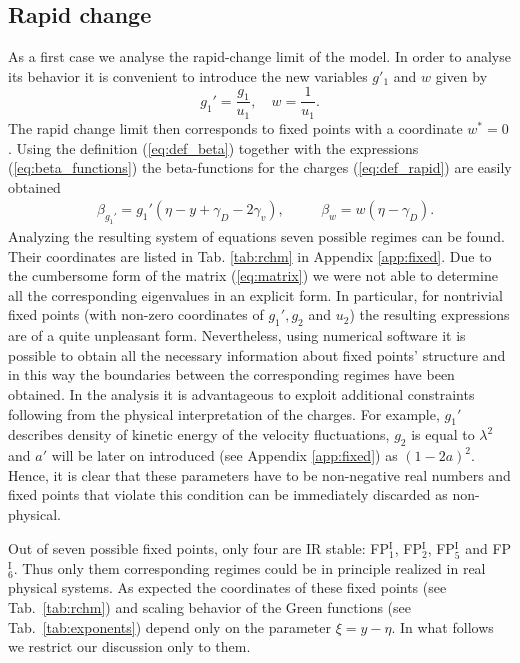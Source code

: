 \documentclass[aps,pre,url,twocolumn,superscriptaddress]{revtex4-1}
\newcommand{\fp}[2]{FP$^{\textrm{#1}}_{#2}$}
\begin{document}
\subsection{Rapid change \label{subsec:rapid}}
As a first case we analyse the rapid-change limit of the model.
In order to analyse its behavior it is convenient \cite{Ant99,Ant00}
to introduce the new variables $g'_1$ and $w $ given by
\begin{equation}
   g_1' = \frac{g_1}{u_1}, \quad w=\frac{1}{u_1}.
   \label{eq:def_rapid}
\end{equation}
The rapid change limit then corresponds to fixed points with a coordinate $w^* = 0$.
Using the definition (\ref{eq:def_beta}) together with the
expressions (\ref{eq:beta_functions}) the beta-functions for the charges (\ref{eq:def_rapid})
are easily obtained 
\begin{align}
   & \beta_{g_1'} = g_1' (\eta - y +\gamma_D - 2\gamma_v) , \quad
   & &\beta_{w} = w(\eta - \gamma_D ).   
\end{align}
Analyzing the resulting system of equations  seven possible regimes
 can be found. Their coordinates are listed in Tab. \ref{tab:rchm} in 
Appendix \ref{app:fixed}. Due to the cumbersome form of the matrix
(\ref{eq:matrix}) we were not able to determine all the corresponding eigenvalues in 
 an explicit form. In particular, for nontrivial fixed points (with non-zero coordinates 
 of $g_1',g_2$ and $u_2$) the resulting expressions
are of a quite unpleasant form. Nevertheless, using numerical software \cite{mathematica}
it is possible to obtain
all the necessary information about fixed points' structure and in this way
the boundaries between the corresponding regimes have been obtained.
In the analysis it is advantageous to exploit additional constraints
following from the physical interpretation of the charges. For example,  
 $g_1'$ describes density of kinetic energy of the velocity fluctuations,
 $g_2$ is equal to $\lambda^2$ and $a'$ will be later
 on introduced (see Appendix \ref{app:fixed}) as $(1-2a)^2$. Hence, it is clear that these
 parameters have to be non-negative real numbers and fixed points that 
 violate this condition can be immediately discarded as non-physical.
 
 Out of seven possible fixed points, only 
four are IR stable: \fp{I}{1}, \fp{I}{2}, \fp{I}{5} and \fp{I}{6}. 
Thus only them corresponding regimes could be in principle realized in real physical systems. As
expected \cite{Ant00} the coordinates of these fixed points (see Tab.~\ref{tab:rchm}) and scaling behavior 
of the Green functions (see Tab.~\ref{tab:exponents})
depend only on the parameter $\xi=y-\eta$.
In what follows we restrict our discussion
only to them. 
\end{document}
